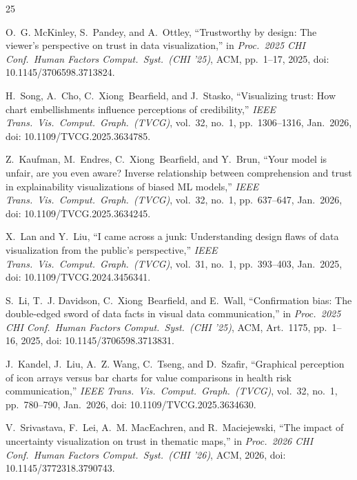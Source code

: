 \documentclass[conference]{IEEEtran}
\begin{document}
\begin{thebibliography}{25}

O.~G. McKinley, S.~Pandey, and A.~Ottley, ``Trustworthy by design: The viewer's perspective on trust in data visualization,'' in \textit{Proc.\ 2025 CHI Conf.\ Human Factors Comput.\ Syst.\ (CHI '25)}, ACM, pp.~1--17, 2025, doi: 10.1145/3706598.3713824.

H.~Song, A.~Cho, C.~Xiong~Bearfield, and J.~Stasko, ``Visualizing trust: How chart embellishments influence perceptions of credibility,'' \textit{IEEE Trans.\ Vis.\ Comput.\ Graph.\ (TVCG)}, vol.~32, no.~1, pp.~1306--1316, Jan.\ 2026, doi: 10.1109/TVCG.2025.3634785.

Z.~Kaufman, M.~Endres, C.~Xiong~Bearfield, and Y.~Brun, ``Your model is unfair, are you even aware? Inverse relationship between comprehension and trust in explainability visualizations of biased ML models,'' \textit{IEEE Trans.\ Vis.\ Comput.\ Graph.\ (TVCG)}, vol.~32, no.~1, pp.~637--647, Jan.\ 2026, doi: 10.1109/TVCG.2025.3634245.

X.~Lan and Y.~Liu, ``I came across a junk: Understanding design flaws of data visualization from the public's perspective,'' \textit{IEEE Trans.\ Vis.\ Comput.\ Graph.\ (TVCG)}, vol.~31, no.~1, pp.~393--403, Jan.\ 2025, doi: 10.1109/TVCG.2024.3456341.

S.~Li, T.~J. Davidson, C.~Xiong~Bearfield, and E.~Wall, ``Confirmation bias: The double-edged sword of data facts in visual data communication,'' in \textit{Proc.\ 2025 CHI Conf.\ Human Factors Comput.\ Syst.\ (CHI '25)}, ACM, Art.~1175, pp.~1--16, 2025, doi: 10.1145/3706598.3713831.

J.~Kandel, J.~Liu, A.~Z. Wang, C.~Tseng, and D.~Szafir, ``Graphical perception of icon arrays versus bar charts for value comparisons in health risk communication,'' \textit{IEEE Trans.\ Vis.\ Comput.\ Graph.\ (TVCG)}, vol.~32, no.~1, pp.~780--790, Jan.\ 2026, doi: 10.1109/TVCG.2025.3634630.

V.~Srivastava, F.~Lei, A.~M. MacEachren, and R.~Maciejewski, ``The impact of uncertainty visualization on trust in thematic maps,'' in \textit{Proc.\ 2026 CHI Conf.\ Human Factors Comput.\ Syst.\ (CHI '26)}, ACM, 2026, doi: 10.1145/3772318.3790743.


\end{thebibliography}
\end{document}
